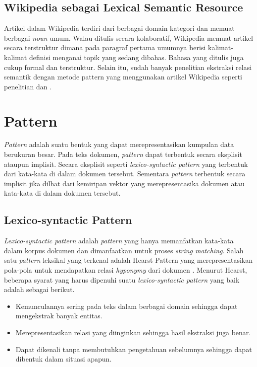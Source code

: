 \subsection{Wikipedia sebagai Lexical Semantic Resource}
Artikel dalam Wikipedia terdiri dari berbagai domain kategori dan memuat berbagai \textit{noun} umum. Walau ditulis secara kolaboratif, Wikipedia memuat artikel secara terstruktur dimana pada paragraf pertama umumnya berisi kalimat-kalimat definisi menganai topik yang sedang dibahas. Bahasa yang ditulis juga cukup formal dan terstruktur. Selain itu, sudah banyak penelitian ekstraksi relasi semantik dengan metode pattern yang menggunakan artikel Wikipedia seperti penelitian \cite{ruiz2005automatic} dan \cite{arnold2014extracting}. 

\section{Pattern}
\textit{Pattern} adalah suatu bentuk yang dapat merepresentasikan kumpulan data berukuran besar. Pada teks dokumen, \textit{pattern} dapat terbentuk secara eksplisit ataupun implisit. Secara eksplisit seperti \textit{lexico-syntactic pattern} yang terbentuk dari kata-kata di dalam dokumen tersebut. Sementara \textit{pattern} terbentuk secara implisit jika dilhat dari kemiripan vektor yang merepresentasika dokumen atau kata-kata di dalam dokumen tersebut.

\subsection{Lexico-syntactic Pattern}
\textit{Lexico-syntactic pattern} adalah \textit{pattern} yang hanya memanfatkan kata-kata dalam korpus dokumen dan dimanfaatkan untuk proses \textit{string matching}. Salah satu \textit{pattern} leksikal yang terkenal adalah Hearst Pattern yang merepresentasikan pola-pola untuk mendapatkan relasi \textit{hyponymy} dari dokumen \citep{hearst1992automatic}. Menurut Hearst, beberapa syarat yang harus dipenuhi suatu \textit{lexico-syntactic pattern} yang baik adalah sebagai berikut.
\begin{itemize}
  \item Kemunculannya sering pada teks dalam berbagai domain sehingga dapat mengekstrak banyak entitas.
  \item Merepresentasikan relasi yang diinginkan sehingga hasil ekstraksi juga benar.
  \item Dapat dikenali tanpa membutuhkan pengetahuan sebelumnya sehingga dapat dibentuk dalam situasi apapun.
\end{itemize}

